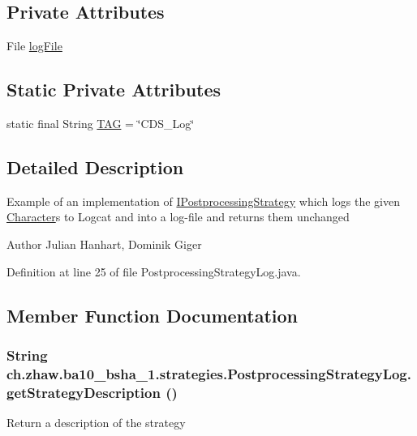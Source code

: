 \subsection*{Private Attributes}
\begin{DoxyCompactItemize}
\item 
File \hyperlink{classch_1_1zhaw_1_1ba10__bsha__1_1_1strategies_1_1PostprocessingStrategyLog_a3e013a950da5adee47ebb45cba9a4abd}{logFile}
\end{DoxyCompactItemize}
\subsection*{Static Private Attributes}
\begin{DoxyCompactItemize}
\item 
static final String \hyperlink{classch_1_1zhaw_1_1ba10__bsha__1_1_1strategies_1_1PostprocessingStrategyLog_a6df45194bbb46859b3418869f3e2daa0}{TAG} = \char`\"{}CDS\_\-Log\char`\"{}
\end{DoxyCompactItemize}


\subsection{Detailed Description}
Example of an implementation of \hyperlink{interfacech_1_1zhaw_1_1ba10__bsha__1_1_1strategies_1_1IPostprocessingStrategy}{IPostprocessingStrategy} which logs the given \hyperlink{classch_1_1zhaw_1_1ba10__bsha__1_1_1Character}{Character}s to Logcat and into a log-\/file and returns them unchanged

\begin{DoxyAuthor}{Author}
Julian Hanhart, Dominik Giger 
\end{DoxyAuthor}


Definition at line 25 of file PostprocessingStrategyLog.java.

\subsection{Member Function Documentation}
\hypertarget{classch_1_1zhaw_1_1ba10__bsha__1_1_1strategies_1_1PostprocessingStrategyLog_a408e3b37b22ae4e501a65ce78afce2a1}{
\subsubsection[{getStrategyDescription}]{\setlength{\rightskip}{0pt plus 5cm}String ch.zhaw.ba10\_\-bsha\_\-1.strategies.PostprocessingStrategyLog.getStrategyDescription ()}}
\label{classch_1_1zhaw_1_1ba10__bsha__1_1_1strategies_1_1PostprocessingStrategyLog_a408e3b37b22ae4e501a65ce78afce2a1}
Return a description of the strategy


